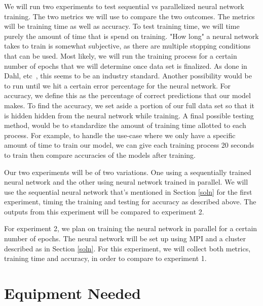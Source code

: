 \documentclass[11pt]{article}
\begin{document}
We will run two experiments to test sequential vs parallelized neural network training. The two metrics we will use to compare the two outcomes. The metrics will be training time as well as accuracy. To test training time, we will time purely the amount of time that is spend on training. "How long" a neural network takes to train is somewhat subjective, as there are multiple stopping conditions that can be used. Most likely, we will run the training process for a certain number of epochs that we will determine once data set is finalized. As done in Dahl, etc~\cite{dahl:NNCluster}, this seems to be an industry standard. Another possibility would be to run until we hit a certain error percentage for the neural network. For accuracy, we define this as the percentage of correct predictions that our model makes. To find the accuracy, we set aside a portion of our full data set so that it is hidden hidden from the neural network while training. A final possible testing method, would be to standardize the amount of training time allotted to each process. For example, to handle the use-case where we only have a specific amount of time to train our model, we can give each training process 20 seconds to train then compare accuracies of the models after training.

Our two experiments will be of two variations. One using a sequentially trained neural network and the other using neural network trained in parallel. We will use the sequential neural network that's mentioned in Section \ref{soln} for the first experiment, timing the training and testing for accuracy as described above. The outputs from this experiment will be compared to experiment 2. 

For experiment 2, we plan on training the neural network in parallel for a certain number of epochs. The neural network will be set up using MPI and a cluster described as in Section \ref{soln}. For this experiment, we will collect both metrics, training time and accuracy, in order to compare to experiment 1. 

\section {Equipment Needed}\label{equip}
\end{document}

